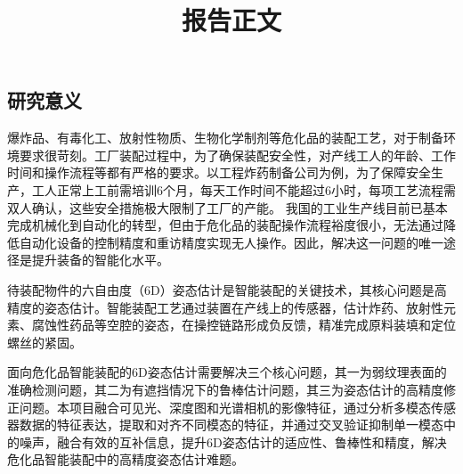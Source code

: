 \documentclass[12pt]{article}
\begin{document}

\title{报告正文}
\maketitle
\thispagestyle{empty}

\subsection{研究意义}

爆炸品、有毒化工、放射性物质、生物化学制剂等危化品的装配工艺，对于制备环境要求很苛刻。工厂装配过程中，为了确保装配安全性，对产线工人的年龄、工作时间和操作流程等都有严格的要求。以工程炸药制备公司为例，为了保障安全生产，工人正常上工前需培训6个月，每天工作时间不能超过6小时，每项工艺流程需双人确认，这些安全措施极大限制了工厂的产能。
我国的工业生产线目前已基本完成机械化到自动化的转型，但由于危化品的装配操作流程裕度很小，无法通过降低自动化设备的控制精度和重访精度实现无人操作。因此，解决这一问题的唯一途径是提升装备的智能化水平。

待装配物件的六自由度（6D）姿态估计是智能装配的关键技术，其核心问题是高精度的姿态估计。智能装配工艺通过装置在产线上的传感器，估计炸药、放射性元素、腐蚀性药品等空腔的姿态，在操控链路形成负反馈，精准完成原料装填和定位螺丝的紧固。

面向危化品智能装配的6D姿态估计需要解决三个核心问题，其一为弱纹理表面的准确检测问题，其二为有遮挡情况下的鲁棒估计问题，其三为姿态估计的高精度修正问题。本项目融合可见光、深度图和光谱相机的影像特征，通过分析多模态传感器数据的特征表达，提取和对齐不同模态的特征，并通过交叉验证抑制单一模态中的噪声，融合有效的互补信息，提升6D姿态估计的适应性、鲁棒性和精度，解决危化品智能装配中的高精度姿态估计难题。
\end{document}
